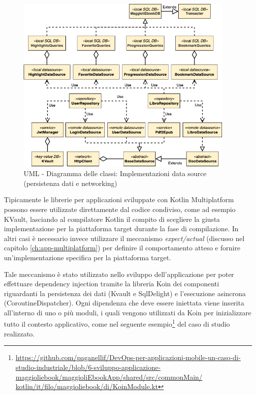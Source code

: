 \begin{figure}[H]
    \centering
    \includegraphics[width=0.95\textwidth]{img/uml-network-db.png}
    \caption{UML - Diagramma delle classi: Implementazioni data source (persistenza dati e networking)}
\end{figure}

Tipicamente le librerie per applicazioni sviluppate con Kotlin Multiplatform possono essere utilizzate direttamente dal codice condiviso,
come ad esempio KVault, 
lasciando al compilatore Kotlin il compito di scegliere la giusta implementazione per la piattaforma target durante la fase di compilazione. 
In altri casi è necessario invece utilizzare il meccanismo \textit{expect/actual} (discusso nel capitolo \ref{ch:app-multiplatform}) per definire il comportamento atteso e fornire un'implementazione specifica per la piattaforma target.

Tale meccanismo è stato utilizzato nello sviluppo dell'applicazione per poter effettuare dependency injection tramite la libreria Koin dei componenti riguardanti la persistenza dei dati (Kvault e SqlDelight) e l'esecuzione asincrona (CoroutineDispatcher). 
Ogni dipendenza che deve essere iniettata viene inserita all'interno di uno o più moduli,
i quali vengono utilizzati da Koin per inizializzare tutto il contesto applicativo, 
come nel seguente esempio\footnote{\href{https://github.com/paganellif/DevOps-per-applicazioni-mobile-un-caso-di-studio-industriale/blob/6-sviluppo-applicazione-maggioliebook/maggioliEbookApp/shared/src/commonMain/kotlin/it/filo/maggioliebook/di/KoinModule.kt}{https://github.com/paganellif/DevOps-per-applicazioni-mobile-un-caso-di-studio-industriale/blob/6-sviluppo-applicazione-maggioliebook/maggioliEbookApp/shared/src/commonMain/\\kotlin/it/filo/maggioliebook/di/KoinModule.kt}} del caso di studio realizzato. 

